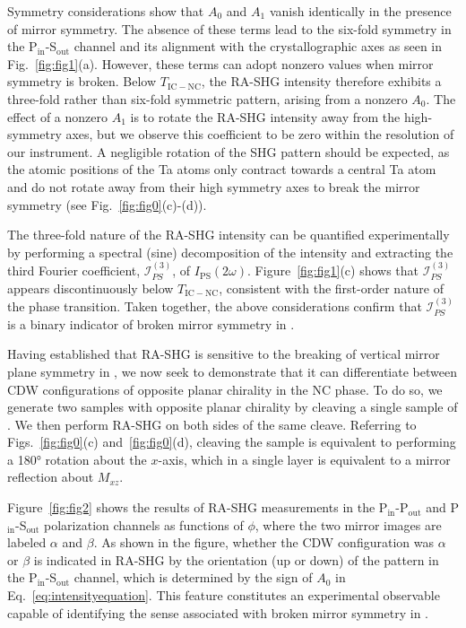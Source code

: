 Symmetry considerations\cite{supplementary_materials} show that $A_0$ and $A_1$ vanish identically in the presence of mirror symmetry. The absence of these terms lead to the six-fold symmetry in the P$_{\mathrm{in}}$-S$_{\mathrm{out}}$ channel and its alignment with the crystallographic axes as seen in Fig.~\ref{fig:fig1}(a).
However, these terms can adopt nonzero values when mirror symmetry is broken.
Below $T_{\mathrm{IC-NC}}$, the RA-SHG intensity therefore exhibits a three-fold rather than six-fold symmetric pattern, arising from a nonzero $A_0$. 
The effect of a nonzero $A_1$ is to rotate the RA-SHG intensity away from the high-symmetry axes, but we observe this coefficient to be zero within the resolution of our instrument.
A negligible rotation of the SHG pattern should be expected, as the atomic positions of the Ta atoms only contract towards a central Ta atom and do not rotate away from their high symmetry axes to break the mirror symmetry (see Fig.~\ref{fig:fig0}(c)-(d)).

The three-fold nature of the RA-SHG intensity can be quantified experimentally by performing a spectral (sine) decomposition of the intensity and extracting the third Fourier coefficient, $\mathscr{I}_{PS}^{(3)}$, of $I_\mathrm{PS}(2\omega)$\cite{supplementary_materials}.
Figure~\ref{fig:fig1}(c) shows that $\mathscr{I}_{PS}^{(3)}$ appears discontinuously below $T_{\mathrm{IC-NC}}$, consistent with the first-order nature of the phase transition.
Taken together, the above considerations confirm that $\mathscr{I}_{PS}^{(3)}$ is a binary indicator of broken mirror symmetry in \tastwo.

Having established that RA-SHG is sensitive to the breaking of vertical mirror plane symmetry in \tastwo, we now seek to demonstrate that it can differentiate between CDW configurations of opposite planar chirality in the NC phase.
To do so, we generate two samples with opposite planar chirality by cleaving a single sample of \tastwo.
We then perform RA-SHG on both sides of the same cleave.
Referring to Figs.~\ref{fig:fig0}(c) and~\ref{fig:fig0}(d), cleaving the sample is equivalent to performing a \ang{180} rotation about the $x$-axis, which in a single layer is equivalent to a mirror reflection about $M_{xz}$.

Figure~\ref{fig:fig2} shows the results of RA-SHG measurements in the P$_\mathrm{in}$-P$_\mathrm{out}$ and P$_\mathrm{in}$-S$_\mathrm{out}$ polarization channels as functions of $\phi$, where the two mirror images are labeled $\alpha$ and $\beta$.
As shown in the figure, whether the CDW configuration was $\alpha$ or $\beta$ is indicated in RA-SHG by the orientation (up or down) of the pattern in the P$_\mathrm{in}$-S$_\mathrm{out}$ channel, which is determined by the sign of $A_0$ in Eq.~\ref{eq:intensityequation}\cite{supplementary_materials}.
This feature constitutes an experimental observable capable of identifying the sense associated with broken mirror symmetry in \tastwo. 

